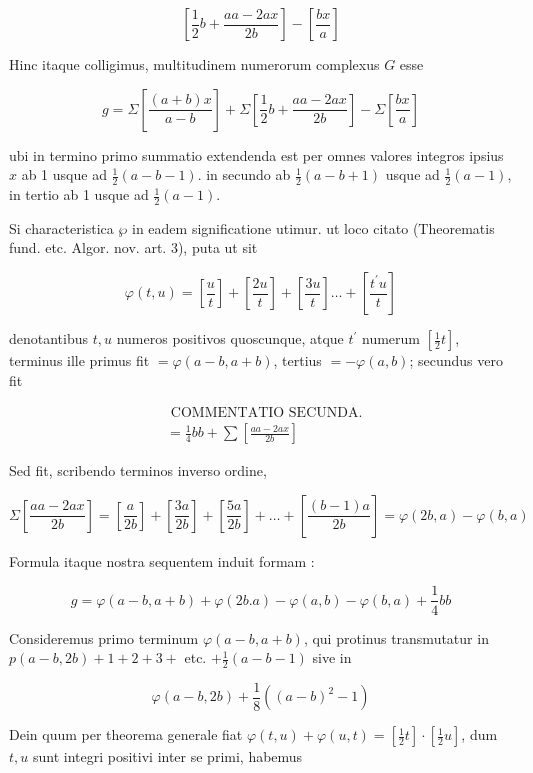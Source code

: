 \documentclass[10pt]{article}
\begin{document}
\[
\left[\frac{1}{2} b+\frac{a a-2 a x}{2 b}\right]-\left[\frac{b x}{a}\right]
\]

Hinc itaque colligimus, multitudinem numerorum complexus \(G\) esse

\[
g=\Sigma\left[\frac{(a+b) x}{a-b}\right]+\Sigma\left[\frac{1}{2} b+\frac{a a-2 a x}{2 b}\right]-\Sigma\left[\frac{b x}{a}\right]
\]

ubi in termino primo summatio extendenda est per omnes valores integros ipsius \(x\) ab 1 usque ad \(\frac{1}{2}(a-b-1)\). in secundo ab \(\frac{1}{2}(a-b+1)\) usque ad \(\frac{1}{2}(a-1)\), in tertio ab 1 usque ad \(\frac{1}{2}(a-1)\).

Si characteristica \(\wp\) in eadem significatione utimur. ut loco citato (Theorematis fund. etc. Algor. nov. art. 3), puta ut sit

\[
\varphi(t, u)=\left[\frac{u}{t}\right]+\left[\frac{2 u}{t}\right]+\left[\frac{3 u}{t}\right] \ldots+\left[\frac{t^{\prime} u}{t}\right]
\]

denotantibus \(t, u\) numeros positivos quoscunque, atque \(t^{\prime}\) numerum \(\left[\frac{1}{2} t\right]\), terminus ille primus fit \(=\varphi(a-b, a+b)\), tertius \(=-\varphi(a, b)\); secundus vero fit

\[
\begin{aligned}
& \text { COMMENTATIO SECUNDA. } \\
& =\frac{1}{4} b b+\sum\left[\frac{a a-2 a x}{2 b}\right]
\end{aligned}
\]

Sed fit, scribendo terminos inverso ordine,

\[
\Sigma\left[\frac{a a-2 a x}{2 b}\right]=\left[\frac{a}{2 b}\right]+\left[\frac{3 a}{2 b}\right]+\left[\frac{5 a}{2 b}\right]+\ldots+\left[\frac{(b-1) a}{2 b}\right]=\varphi(2 b, a)-\varphi(b, a)
\]

Formula itaque nostra sequentem induit formam :

\[
g=\varphi(a-b, a+b)+\varphi(2 b . a)-\varphi(a, b)-\varphi(b, a)+\frac{1}{4} b b
\]

Consideremus primo terminum \(\varphi(a-b, a+b)\), qui protinus transmutatur in \(p(a-b, 2 b)+1+2+3+\) etc. \(+\frac{1}{2}(a-b-1)\) sive in

\[
\varphi(a-b, 2 b)+\frac{1}{8}\left((a-b)^{2}-1\right)
\]

Dein quum per theorema generale fiat \(\varphi(t, u)+\varphi(u, t)=\left[\frac{1}{2} t\right] \cdot\left[\frac{1}{2} u\right]\), dum \(t, u\) sunt integri positivi inter se primi, habemus
\end{document}
